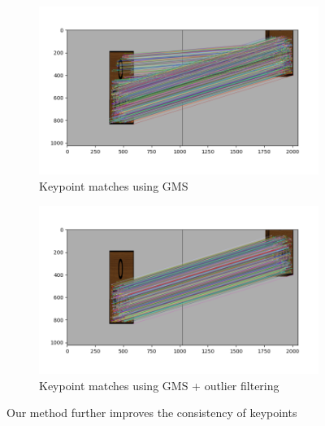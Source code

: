 \begin{figure}[h]
    \centering
    \begin{subfigure}[t]{0.49\textwidth}
        \includegraphics[width=\textwidth]{figures/outliers-gms.png}
        \caption{Keypoint matches using GMS}
        \label{fig:outliers-gms}
    \end{subfigure}
    \hfill
    \begin{subfigure}[t]{0.49\textwidth}
        \includegraphics[width=\textwidth]{figures/outliers-gms+ours.png}
        \caption{Keypoint matches using GMS + outlier filtering}
        \label{fig:outliers-gms+filter}
    \end{subfigure}
    \caption{Our method further improves the consistency of keypoints}
    \label{fig:consensus-filtering}
\end{figure}

